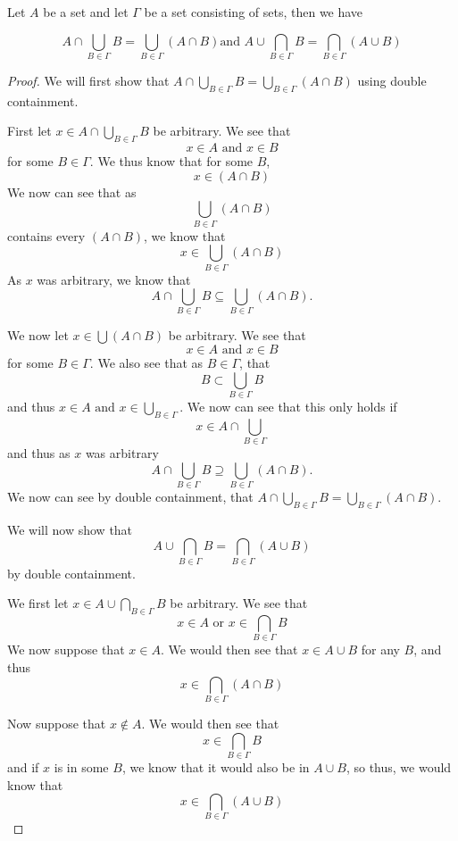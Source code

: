 \begin{majorEx}%
    Let $A$ be a set and let $\Gamma$ be a set consisting of sets, then we have

    $$
    A \cap  \bigcup_{B\in \Gamma} B = \bigcup_{B\in \Gamma} (A \cap B)\text{
    and  } A \cup \bigcap_{B\in \Gamma} B = \bigcap_{B\in \Gamma} (A \cup B)
    $$
\end{majorEx}
\begin{proof}
    We will first show that $A \cap \bigcup_{B\in \Gamma} B = \bigcup_{B\in
    \Gamma} (A \cap B)$ using double containment. 

    First let $x \in A \cap \bigcup_{B\in \Gamma} B$ be arbitrary. We see that
    $$
        x \in A \text{ and } x\in B
    $$ 
    for some $B \in \Gamma$.  We thus know that for some $B$, 
    $$
        x\in (A \cap B)
    $$ 
    We now can see that as 
    $$
        \bigcup_{B\in \Gamma} (A \cap B)
    $$ 
    contains every $(A \cap B)$, we know that 
    $$
        x \in \bigcup_{B\in \Gamma} (A \cap B)
    $$ 
    As $x$ was arbitrary, we know that 
    $$
        A \cap \bigcup_{B\in \Gamma} B \subseteq 
        \bigcup_{B\in \Gamma} (A \cap B).
    $$ 

    We now let $x \in \bigcup (A \cap B)$ be arbitrary.  We see that 
    $$
        x \in A \text{ and } x \in B
    $$ 
    for some $B\in \Gamma$. 
    We also see that as $B\in \Gamma$, that 
    $$
        B \subset \bigcup_{B\in \Gamma} B
    $$ 
    and thus $x \in A \text{ and } x \in \bigcup_{B\in \Gamma}$.  We now can see
    that this only holds if 
    $$
        x \in A \cap \bigcup_{B\in \Gamma}
    $$ 
    and thus as $x$ was arbitrary 
    $$
        A \cap \bigcup_{B\in \Gamma} B \supseteq \bigcup_{B\in \Gamma} (A \cap
        B).
    $$ 
    We now can see by double containment, that $A \cap \bigcup_{B\in \Gamma} B =
    \bigcup_{B\in \Gamma} (A \cap B)$.

    We will now show that 
    $$
        A \cup \bigcap_{B\in \Gamma} B = \bigcap_{B\in \Gamma} (A \cup B)
    $$ 
    by double containment.

    We first let $x \in A \cup \bigcap_{B\in \Gamma} B$ be arbitrary.  We see that 
    $$
        x \in A \text{ or } x \in \bigcap_{B\in \Gamma} B
    $$ 
    We now suppose that $x \in A$. We would then see that $x \in A \cup B$ for
    any $B$, and thus 
    $$
        x \in \bigcap_{B\in \Gamma} (A \cap B)
    $$

    Now suppose that $x \notin A$. We would then see that 
    $$
        x \in \bigcap_{B\in \Gamma} B
    $$ 
    and if $x$ is in some $B$, we know that it would also be in $A
    \cup B$, so thus, we would know that 
    $$
        x \in \bigcap_{B\in \Gamma} (A \cup B)
    $$


\end{proof}
